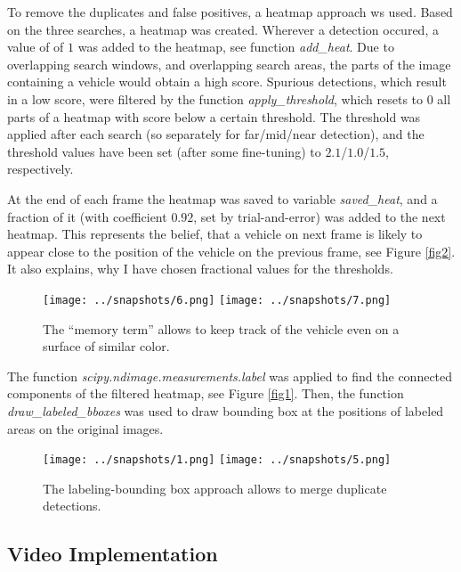 \documentclass[a4paper,10pt]{article}
\begin{document}
To remove the duplicates and false positives, a heatmap approach ws used.
Based on the three searches, a heatmap was created. Wherever a detection occured,
a value of of $1$ was added to the heatmap, see function \emph{add\_heat}. 
Due to overlapping search windows, and overlapping search areas, 
the parts of the image containing a vehicle would obtain a high score.
Spurious detections, which result in a low score, were filtered by the function \emph{apply\_threshold},
which resets to $0$ all parts of a heatmap with score below a certain threshold.
The threshold was applied after each search (so separately for far/mid/near detection),
and the threshold values have been set (after some fine-tuning) to $2.1$/$1.0$/$1.5$, respectively.

At the end of each frame the heatmap was saved to variable \emph{saved\_heat}, and a fraction of it (with coefficient $0.92$, set by trial-and-error)
was added to the next heatmap. 
This represents the belief, that a vehicle on next frame is likely to appear close to the position of the vehicle on the previous frame, see Figure \ref{fig2}.
It also explains, why I have chosen fractional values for the thresholds.

\begin{figure}[h]
  \begin{center}
    \texttt{[image: ../snapshots/6.png]}
    \quad
    \texttt{[image: ../snapshots/7.png]}
\end{center}
\caption{The ``memory term'' allows to keep track of the vehicle even on a surface of similar color.}
\end{figure}\label{fig2}

The function \emph{scipy.ndimage.measurements.label} was applied to find the connected components of the filtered heatmap, see Figure \ref{fig1}.
Then, the function \emph{draw\_labeled\_bboxes} was used 
to draw bounding box at the positions of labeled areas on the original images.

\begin{figure}[h]
  \begin{center}
    \texttt{[image: ../snapshots/1.png]}
    \quad
    \texttt{[image: ../snapshots/5.png]}
\end{center}
\caption{The labeling-bounding box approach allows to merge duplicate detections.}
\end{figure}\label{fig1}

\subsection{Video Implementation}
\end{document}
